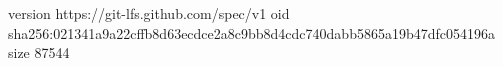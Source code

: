 version https://git-lfs.github.com/spec/v1
oid sha256:021341a9a22cffb8d63ecdce2a8c9bb8d4cdc740dabb5865a19b47dfc054196a
size 87544
